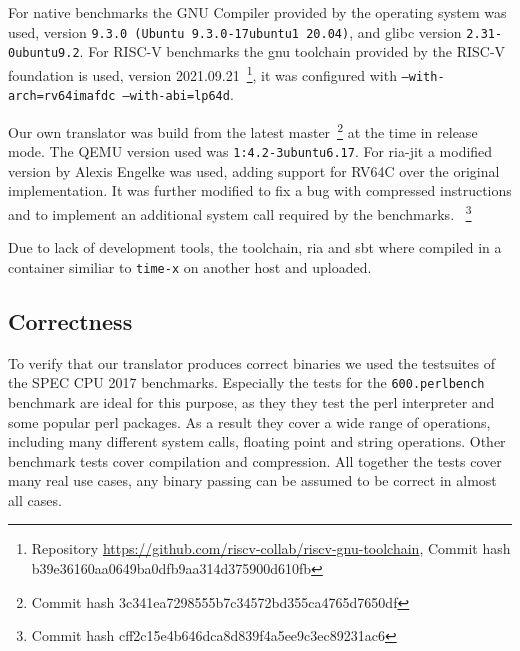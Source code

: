 \documentclass[course=eragp]{aspdoc}
\begin{document}
For native benchmarks the GNU Compiler provided by the operating system was used,
version \texttt{9.3.0 (Ubuntu 9.3.0-17ubuntu1~20.04)}, and glibc version \texttt{2.31-0ubuntu9.2}.
For RISC-V benchmarks the gnu toolchain provided by the RISC-V foundation is used, version 2021.09.21~\footnote{Repository \url{https://github.com/riscv-collab/riscv-gnu-toolchain}, Commit hash b39e36160aa0649ba0dfb9aa314d375900d610fb},
it was configured with \texttt{--with-arch=rv64imafdc --with-abi=lp64d}.

\par

Our own translator was build from the latest master~\footnote{Commit hash 3c341ea7298555b7c34572bd355ca4765d7650df} at the time in release mode.
The QEMU version used was \texttt{1:4.2-3ubuntu6.17}.
For ria-jit a modified version by Alexis Engelke was used, adding support for RV64C over the original implementation.
It was further modified to fix a bug with compressed instructions and to implement an additional system call required by the benchmarks.
~\footnote{Commit hash cff2c15e4b646dca8d839f4a5ee9c3ec89231ac6}

\par

Due to lack of development tools, the toolchain, ria and sbt where compiled in a container similiar to \texttt{time-x} on another host and uploaded. %


\subsection{Correctness}

To verify that our translator produces correct binaries we used the testsuites of the SPEC CPU 2017 benchmarks.
Especially the tests for the \texttt{600.perlbench} benchmark are ideal for this purpose, as they they test the perl interpreter and some popular perl packages.
As a result they cover a wide range of operations, including many different system calls, floating point and string operations.
Other benchmark tests cover compilation and compression.
All together the tests cover many real use cases, any binary passing can be assumed to be correct in almost all cases.
\end{document}
